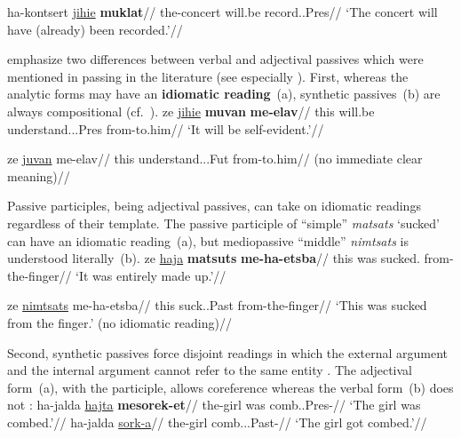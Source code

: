     \a \begingl
        \gla ha-kontsert \underline{jihie} \textbf{muklat}//
        \glb the-concert will.be record..Pres//
        \glft `The concert will have (already) been recorded.'//
    \endgl
\xe

\cite{kastnerzu15li} emphasize two differences between verbal and adjectival passives which were mentioned in passing in the literature (see especially \citealt{meltzerasscher11}). First, whereas the analytic forms may have an \textbf{idiomatic reading}~(\nextx a), synthetic passives~(\nextx b) are always compositional (cf.~\citealt{horvathsiloni09}).
\pex \label{ex:idiom}
    \a 
        \begingl
        \gla {}ze \underline{jihie} \textbf{muvan} \textbf{me-elav}//
        \glb this will.be understand...Pres from-to.him//
        \glft `It will be self-evident.'//
        \endgl

    \a \ljudge{\#}
        \begingl
        \gla {}ze \underline{juvan} me-elav//
        \glb this understand...Fut from-to.him//
        \glft (no immediate clear meaning)//
        \endgl
\xe

Passive participles, being adjectival passives, can take on idiomatic readings regardless of their template. The passive participle of ``simple'' \emph{matsats} `sucked' can have an idiomatic reading~(\nextx a), but mediopassive ``middle'' \emph{nimtsats} is understood literally~(\nextx b).
\pex
    \a
        \begingl
        \gla {}ze \underline{haja} \textbf{matsuts} \textbf{me-ha-etsba}//
        \glb this was sucked. from-the-finger//
        \glft `It was entirely made up.'//
        \endgl
    
    \a
        \begingl
        \gla {}ze \underline{nimtsats} me-ha-etsba//
        \glb this suck..Past from-the-finger//
        \glft `This was sucked from the finger.' (no idiomatic reading)//
        \endgl
\xe

Second, synthetic passives force disjoint readings in which the external argument and the internal argument cannot refer to the same entity \citep{bakeretal89}. The adjectival form~(\nextx a), with the participle, allows coreference whereas the verbal form~(\nextx b) does not \citep[720]{sichel09}:
\pex \label{ex:disjoint}
    \a \begingl
        \gla {}ha-jalda \underline{hajta} \textbf{mesorek-et}//
        \glb the-girl was comb..Pres-//
        \glft `The girl was combed.'//
        \endgl
    \a
        \begingl
        \gla {}ha-jalda \underline{sork-a}//
        \glb the-girl comb...Past-//
        \glft `The girl got combed.'//
        \endgl
\xe

